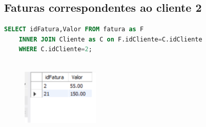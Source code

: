 \subsection{Faturas correspondentes ao cliente 2}
\begin{lstlisting}[language=SQL]
SELECT idFatura,Valor FROM fatura as F
	INNER JOIN Cliente as C on F.idCliente=C.idCliente
    WHERE C.idCliente=2;
    
\end{lstlisting}
\begin{figure}[h]
\begin{center}
\includegraphics[scale=1.0]{implementacao_fisica/Desenho.png} 
\centering
\end{center}
\end{figure}
\clearpage

